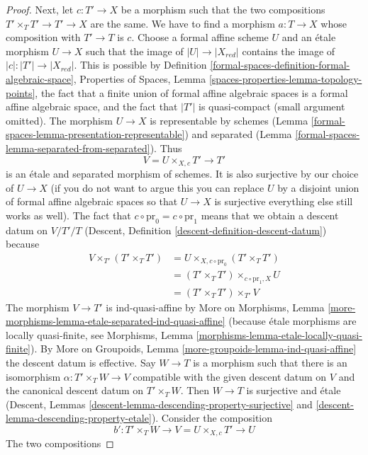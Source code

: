 \begin{proof}
\medskip\noindent
Next, let $c : T' \to X$ be a morphism such that the two compositions
$T' \times_T T' \to T' \to X$ are the same. We have to find a morphism
$a : T \to X$ whose composition with $T' \to T$ is $c$. Choose a
formal affine scheme $U$ and an \'etale morphism $U \to X$ such that the image
of $|U| \to |X_{red}|$ contains the image of $|c| : |T'| \to |X_{red}|$.
This is possible by
Definition \ref{formal-spaces-definition-formal-algebraic-space},
Properties of Spaces, Lemma \ref{spaces-properties-lemma-topology-points},
the fact that a finite union of formal affine algebraic spaces is a
formal affine algebraic space, and the fact that $|T'|$ is quasi-compact
(small argument omitted). The morphism $U \to X$ is representable
by schemes (Lemma \ref{formal-spaces-lemma-presentation-representable}) and
separated (Lemma \ref{formal-spaces-lemma-separated-from-separated}). Thus
$$
V = U \times_{X, c} T' \longrightarrow T'
$$
is an \'etale and separated morphism of schemes. It is also surjective
by our choice of $U \to X$ (if you do not want to argue this you can
replace $U$ by a disjoint union of formal affine algebraic spaces so that
$U \to X$ is surjective everything else still works as well). The fact that
$c \circ \text{pr}_0 = c \circ \text{pr}_1$ means that we obtain a
descent datum on $V/T'/T$
(Descent, Definition \ref{descent-definition-descent-datum})
because
\begin{align*}
V \times_{T'} (T' \times_T T')
& =
U \times_{X, c \circ \text{pr}_0} (T' \times_T T') \\
& =
(T' \times_T T') \times_{c \circ \text{pr}_1, X} U \\
& =
(T' \times_T T') \times_{T'} V
\end{align*}
The morphism $V \to T'$ is ind-quasi-affine by
More on Morphisms, Lemma
\ref{more-morphisms-lemma-etale-separated-ind-quasi-affine}
(because \'etale morphisms are locally quasi-finite, see
Morphisms, Lemma \ref{morphisms-lemma-etale-locally-quasi-finite}).
By More on Groupoids, Lemma \ref{more-groupoids-lemma-ind-quasi-affine}
the descent datum is effective. Say $W \to T$ is a morphism
such that there is an isomorphism $\alpha : T' \times_T W \to V$
compatible with the given descent datum on $V$ and the canonical descent
datum on $T' \times_T W$. Then $W \to T$ is surjective and \'etale
(Descent, Lemmas \ref{descent-lemma-descending-property-surjective} and
\ref{descent-lemma-descending-property-etale}).
Consider the composition
$$
b' : T' \times_T W \longrightarrow V = U \times_{X, c} T' \longrightarrow U
$$
The two compositions

\end{proof}
